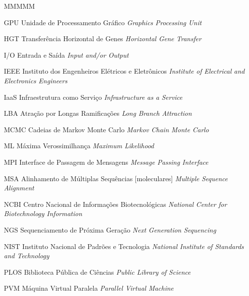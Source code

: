 \documentclass[english,brazilian]{UNISINOSmonografia} %
\begin{document}
\begin{listadesiglas}{MMMMM}
	\item[GPU] Unidade de Processamento Gráfico \newline \textit{Graphics Processing Unit}
	\item[HGT] Transferência Horizontal de Genes \newline \textit{Horizontal Gene Transfer}
	\item[I/O] Entrada e Saída \newline \textit{Input and/or Output}
	\item[IEEE] Instituto dos Engenheiros Elétricos e Eletrônicos \newline \textit{Institute of Electrical and Electronics Engineers}
	\item[IaaS] Infraestrutura como Serviço \newline \textit{Infrastructure as a Service}
	\item[LBA] Atração por Longas Ramificações \newline \textit{Long Branch Attraction}
	\item[MCMC] Cadeias de Markov Monte Carlo \newline \textit{Markov Chain Monte Carlo}
	\item[ML] Máxima Verossimilhança \newline \textit{Maximum Likelihood}
	\item[MPI] Interface de Passagem de Mensagens \newline \textit{Message Passing Interface}
	\item[MSA] Alinhamento de Múltiplas Sequências [moleculares] \newline \textit{Multiple Sequence Alignment}
	\item[NCBI] Centro Nacional de Informações Biotecnológicas \newline \textit{National Center for Biotechnology Information}
	\item[NGS] Sequenciamento de Próxima Geração \newline \textit{Next Generation Sequencing}
	\item[NIST] Instituto Nacional de Padrões e Tecnologia \newline \textit{National Institute of Standards and Technology}
	\item[PLOS] Biblioteca Pública de Ciências \newline \textit{Public Library of Science}
	\item[PVM] Máquina Virtual Paralela \newline \textit{Parallel Virtual Machine}

\end{listadesiglas}
\end{document}
